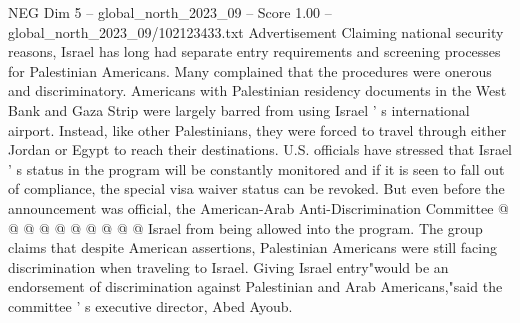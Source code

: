 \begin{textsample}{NEG Dim 5 – global\_north\_2023\_09 – Score 1.00 – global\_north\_2023\_09/102123433.txt}
Advertisement Claiming national security reasons, Israel has long had separate entry requirements and screening processes for Palestinian Americans.
Many complained that the procedures were onerous and discriminatory.
Americans with Palestinian residency documents in the West Bank and Gaza Strip were largely barred from using Israel ' s international airport.
Instead, like other Palestinians, they were forced to travel through either Jordan or Egypt to reach their destinations.
U.S. officials have stressed that Israel ' s status in the program will be constantly monitored and if it is seen to fall out of compliance, the special visa waiver status can be revoked.
But even before the announcement was official, the American-Arab Anti-Discrimination Committee @ @ @ @ @ @ @ @ @ @ Israel from being allowed into the program.
The group claims that despite American assertions, Palestinian Americans were still facing discrimination when traveling to Israel.
Giving Israel entry"would be an endorsement of discrimination against Palestinian and Arab Americans,"said the committee ' s executive director, Abed Ayoub.

\end{textsample}
